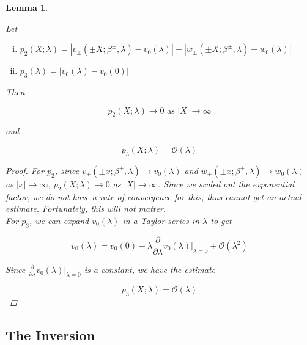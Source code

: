 \documentclass[12pt]{article}
\newtheorem{lemma}{Lemma}
\begin{document}

\begin{lemma}\label{centerbounds}

Let
\begin{enumerate}[(i)]
\item $p_2(X; \lambda) = |v_\pm(\pm X; \beta^\pm, \lambda) - v_0(\lambda)| + |w_\pm(\pm X; \beta^\pm, \lambda) - w_0(\lambda)|$
\item $p_3(\lambda) = |v_0(\lambda) - v_0(0)|$
\end{enumerate}

Then 

\begin{equation}\label{p2limit}
p_2(X; \lambda) \rightarrow 0 \text{ as } |X| \rightarrow \infty
\end{equation}

and

\begin{equation}\label{p3bound}
p_3(X; \lambda) = \mathcal{O}(\lambda)  
\end{equation}

\begin{proof}

For $p_2$, since $v_\pm(\pm x; \beta^\pm, \lambda) \rightarrow v_0(\lambda)$ and $w_\pm(\pm x; \beta^\pm, \lambda) \rightarrow w_0(\lambda)$ as $|x| \rightarrow \infty$, $p_2(X; \lambda) \rightarrow 0$ as $|X| \rightarrow \infty$. Since we scaled out the exponential factor, we do not have a rate of convergence for this, thus cannot get an actual estimate. Fortunately, this will not matter.\\

For $p_3$, we can expand $v_0(\lambda)$ in a Taylor series in $\lambda$ to get

\[
v_0(\lambda) = v_0(0) + \lambda \frac{\partial}{\partial \lambda}v_0(\lambda)\Big|_{\lambda = 0} + \mathcal{O}(\lambda^2)
\]

Since $\frac{\partial}{\partial \lambda}v_0(\lambda)\Big|_{\lambda = 0}$ is a constant, we have the estimate

\[
p_3(X; \lambda) = \mathcal{O}(\lambda) 
\]

\end{proof}
\end{lemma}

\subsection{The Inversion}
\end{document}

